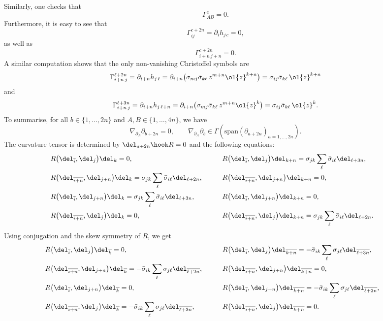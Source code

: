 Similarly,
one
checks that
\[\Gamma^{c}_{AB} =0.\]
Furthermore, it is easy to see that
\[
\Gamma^{c+2n}_{i j}= \partial_{i}h_{j\, c}=0, \]
as well as
\[
\Gamma^{c+2n}_{i+n\,j+n}=0.
\]
A similar computation shows that the only non-vanishing Christoffel symbols are
\[
\Gamma^{\ell+2n}_{i+n\, j}
 =
 \partial_{i+n} h_{ j\, \ell}
 =
 \partial_{i+n} \bigl(
 \sigma_{mj}\bar{\sigma}_{k\ell}\,
 z^{m+n}\ol{z}^{k+n}\bigr)
 =
 \sigma_{ij}\bar{\sigma}_{k\ell}\,
\ol{z}^{k+n}
\]
and
 \[ \Gamma^{\ell+3n}_{i+n\, j}
 =
 \partial_{i+n} h_{ j\, \ell+n}
 =
 \partial_{i+n} \bigl(
 \sigma_{mj}\bar{\sigma}_{k\ell}\,
 z^{m+n}\ol{z}^{k} \bigr)
 =
 \sigma_{ij}\bar{\sigma}_{k\ell}\,
\ol{z}^{k} .\]
To summarise, for all $b\in \{1, \ldots, 2n\}$ and $A,B\in \{1, \ldots, 4n\}$, we have
\begin{equation}
\label{LC1}
\nabla_{\partial_A}\partial_{b+2n}=0,\qquad
\nabla_{\partial_A}\partial_b \in \Gamma (\mathrm{span} (\partial_{a+2n})_{a=1,\ldots, 2n}).\end{equation}
The curvature tensor is determined by ${\del_{a+2n}\hook R=0}$ and the following equations:
\begin{alignat*}{3}
&R\bigl(\del_{\overline{i}},\del_{j}\bigr)\del_{k} = 0,\qquad&& R\bigl(\del_{\overline{i}},\del_{j}\bigr)\del_{k+n} = \sigma_{jk}\sum_{\ell}\bar{\sigma}_{i\ell} \del_{\ell+3n},&
\\
&R\bigl(\del_{\overline{i+n}},\del_{j+n}\bigr)\del_{k} = \sigma_{jk}\sum_{\ell}\bar{\sigma}_{i\ell} \del_{\ell+2n},\qquad&& R\bigl(\del_{\overline{i+n}},\del_{j+n}\bigr)\del_{k+n} = 0,&
\\
&R\bigl(\del_{\overline{i}},\del_{j+n}\bigr)\del_{k} = \sigma_{jk}\sum_{\ell}\bar{\sigma}_{i\ell} \del_{\ell+3n},\qquad&& R\bigl(\del_{\overline{i}},\del_{j+n}\bigr)\del_{k+n} = 0,&
\\
&R\bigl(\del_{\overline{i+n}},\del_{j}\bigr)\del_{k} = 0,\qquad&& R\bigl(\del_{\overline{i+n}},\del_{j}\bigr)\del_{k+n} =
\sigma_{jk}\sum_{\ell}\bar{\sigma}_{i\ell} \del_{\ell+2n}.&
\end{alignat*}
Using conjugation and the skew symmetry of $R$, we get
\begin{alignat*}{3}
&R\bigl(\del_{\overline{i}},\del_{j}\bigr)\del_{\overline{k}} = 0,\qquad&& R\bigl(\del_{\overline{i}},\del_{j}\bigr)\del_{\overline{k+n}} = -\bar{\sigma}_{ik}\sum_{\ell}{\sigma}_{j\ell} \del_{\overline{\ell+3n}},&
\\
&R\bigl(\del_{\overline{i+n}},\del_{j+n}\bigr)\del_{\overline{k}} = -\bar{\sigma}_{ik}\sum_{\ell}{\sigma}_{j\ell} \del_{\overline{\ell+2n}}, \qquad&& R\bigl(\del_{\overline{i+n}},\del_{j+n}\bigr)\del_{\overline{k+n}} = 0,&
\\
&R\bigl(\del_{\overline{i}},\del_{j+n}\bigr)\del_{\overline{k}} = 0,\qquad&& R\bigl(\del_{\overline{i}},\del_{j+n}\bigr)\del_{\overline{k+n}} =
-\bar{\sigma}_{ik}\sum_{\ell}{\sigma}_{j\ell} \del_{\overline{\ell+2n}},&
\\
&R\bigl(\del_{\overline{i+n}},\del_{j}\bigr)\del_{\overline{k}} =
-\bar{\sigma}_{ik}\sum_{\ell}{\sigma}_{j\ell} \del_{\overline{\ell+3n}},\qquad&& R\bigl(\del_{\overline{i+n}},\del_{j}\bigr)\del_{\overline{k+n}} =0.&
\end{alignat*}
